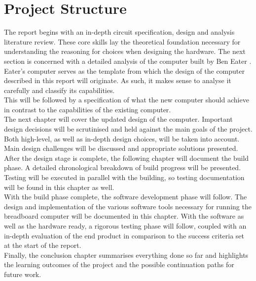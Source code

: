 \documentclass[11pt]{informatics-report}
\begin{document}
\section{Project Structure}
The report begins with an in-depth circuit specification, design and analysis literature review. These core skills lay the theoretical foundation necessary for understanding the reasoning for choices when designing the hardware.
The next section is concerned with a detailed analysis of the computer built by Ben Eater \cite{eater2019breadboard}. Eater's computer serves as the template from which the design of the computer described in this report will originate. As such, it makes sense to analyse it carefully and classify its capabilities. \\
This will be followed by a specification of what the new computer should achieve in contrast to the capabilities of the existing computer. \\
The next chapter will cover the updated design of the computer. Important design decisions will be scrutinised and held against the main goals of the project. Both high-level, as well as in-depth design choices, will be taken into account. Main design challenges will be discussed and appropriate solutions presented. \\
After the design stage is complete, the following chapter will document the build phase. A detailed chronological breakdown of build progress will be presented. Testing will be executed in parallel with the building, so testing documentation will be found in this chapter as well. \\
With the build phase complete, the software development phase will follow. The design and implementation of the various software tools necessary for running the breadboard computer will be documented in this chapter.
With the software as well as the hardware ready, a rigorous testing phase will follow, coupled with an in-depth evaluation of the end product in comparison to the success criteria set at the start of the report. \\
Finally, the conclusion chapter summarises everything done so far and highlights the learning outcomes of the project and the possible continuation paths for future work. \\


% 

% 
% 
% 
% 




% 
% 
% 
\end{document}
